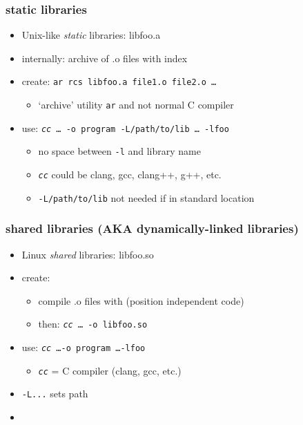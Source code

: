 \begin{frame}\frametitle{static libraries}
    \begin{itemize}
    \item Unix-like \textit{static} libraries: libfoo.a
    \item internally: archive of .o files with index
    \item create: \texttt{ar rcs libfoo.a file1.o file2.o \ldots}
        \begin{itemize}
        \item `archive' utility \texttt{ar} and not normal C compiler
        \end{itemize}
    \item use: \texttt{\textit{cc} \ldots~-o program -L/path/to/lib \ldots~-lfoo}
        \begin{itemize}
        \item no space between \texttt{-l} and library name
        \item \texttt{\textit{cc}} could be clang, gcc, clang++, g++, etc.
        \item \texttt{-L/path/to/lib} not needed if in standard location
        \end{itemize}
    \end{itemize}
\end{frame}

\begin{frame}\frametitle{shared libraries (AKA dynamically-linked libraries)}
    \begin{itemize}
    \item Linux \textit{shared} libraries: libfoo.so
    \item create:
        \begin{itemize}
        \item compile .o files with  (position independent code)
        \item then: \texttt{\textit{cc}  \ldots~-o libfoo.so}
        \end{itemize}
    \item use: \texttt{\textit{cc} \ldots -o program  \ldots -lfoo}
        \begin{itemize}
        \item \texttt{\textit{cc}} = C compiler (clang, gcc, etc.)
        \end{itemize}
    \vspace{.5cm}
    \item<2-> \texttt{-L...} sets path \textit{}
    \item<2-> 
    \end{itemize}
\end{frame}
